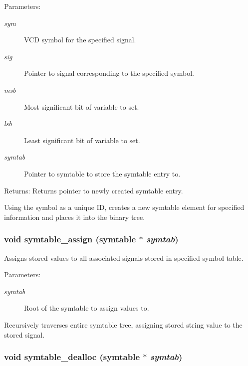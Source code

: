 \begin{Desc}
\item[Parameters:]
\begin{description}
\item[{\em sym}]VCD symbol for the specified signal. \item[{\em sig}]Pointer to signal corresponding to the specified symbol. \item[{\em msb}]Most significant bit of variable to set. \item[{\em lsb}]Least significant bit of variable to set. \item[{\em symtab}]Pointer to symtable to store the symtable entry to.\end{description}
\end{Desc}
\begin{Desc}
\item[Returns:]Returns pointer to newly created symtable entry.\end{Desc}
Using the symbol as a unique ID, creates a new symtable element for specified information and places it into the binary tree. 
\subsubsection{\setlength{\rightskip}{0pt plus 5cm}void symtable\_\-assign ({\bf symtable} $\ast$ {\em symtab})}\label{symtable_8h_a4}


Assigns stored values to all associated signals stored in specified symbol table. 

\begin{Desc}
\item[Parameters:]
\begin{description}
\item[{\em symtab}]Root of the symtable to assign values to.\end{description}
\end{Desc}
Recursively traverses entire symtable tree, assigning stored string value to the stored signal. 
\subsubsection{\setlength{\rightskip}{0pt plus 5cm}void symtable\_\-dealloc ({\bf symtable} $\ast$ {\em symtab})}\label{symtable_8h_a5}



